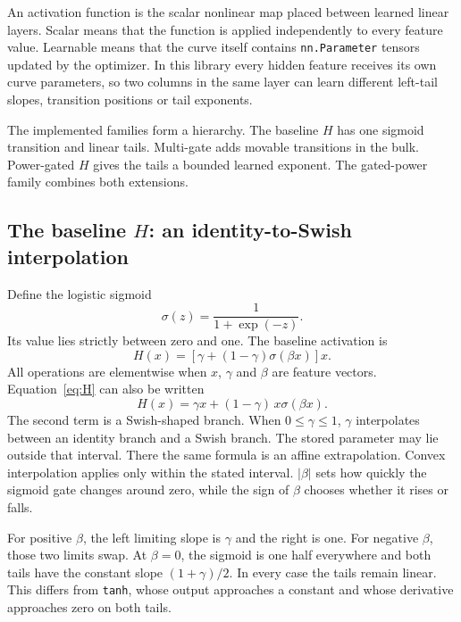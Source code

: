 \documentclass[10pt,aps,prd,twocolumn,nofootinbib]{revtex4-2}
\newcommand{\code}[1]{\texttt{#1}}
\begin{document}
An activation function is the scalar nonlinear map placed between learned
linear layers.  Scalar means that the function is applied independently to
every feature value.  Learnable means that the curve itself contains
\code{nn.Parameter} tensors updated by the optimizer.  In this library every
hidden feature receives its own curve parameters, so two columns in the same
layer can learn different left-tail slopes, transition positions or tail
exponents.

The implemented families form a hierarchy.  The baseline \(H\) has one
sigmoid transition and linear tails.  Multi-gate adds movable transitions in
the bulk.  Power-gated \(H\) gives the tails a bounded learned exponent.  The
gated-power family combines both extensions.

\subsection{The baseline \(H\): an identity-to-Swish interpolation}

Define the logistic sigmoid
\begin{equation*}
  \sigma(z)=\frac{1}{1+\exp(-z)}.
\end{equation*}
Its value lies strictly between zero and one.  The baseline activation is
\begin{equation}
 H(x)=\left[\gamma+(1-\gamma)\sigma(\beta x)\right]x.
 \label{eq:H}
\end{equation}
All operations are elementwise when \(x\), \(\gamma\) and \(\beta\) are
feature vectors.  Equation~\eqref{eq:H} can also be written
\begin{equation*}
 H(x)=\gamma x+(1-\gamma)\,x\sigma(\beta x).
\end{equation*}
The second term is a Swish-shaped branch.  When $0\le\gamma\le1$,
\(\gamma\) interpolates between an identity branch and a Swish branch.  The
stored parameter may lie outside that interval.  There the same formula is an
affine extrapolation.  Convex interpolation applies only within the stated
interval.
$|\beta|$ sets how quickly the sigmoid gate changes around zero, while the
sign of \(\beta\) chooses whether it rises or falls.

For positive \(\beta\), the left limiting slope is $\gamma$ and the right is
one.  For negative \(\beta\), those two limits swap.  At \(\beta=0\), the
sigmoid is one half everywhere and both tails have the constant slope
$(1+\gamma)/2$.  In every case the tails remain linear.  This differs from
\code{tanh}, whose output approaches a constant and whose derivative
approaches zero on both tails.
\end{document}
